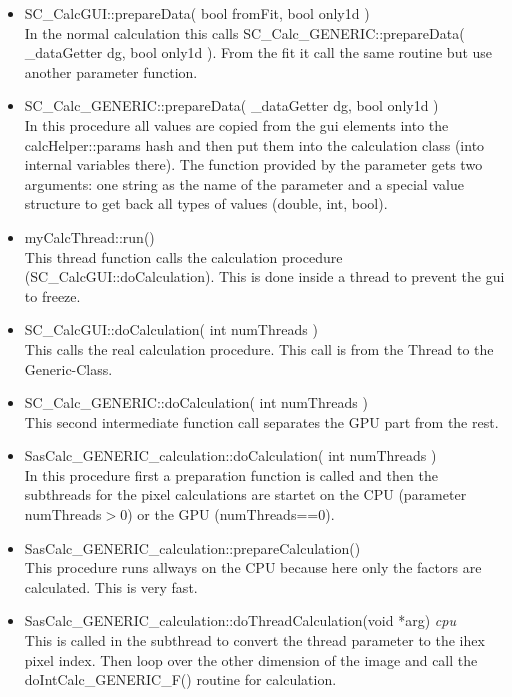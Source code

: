 \documentclass[11pt]{article} %
\begin{document}
\begin{itemize}
\item SC\_CalcGUI::prepareData( bool fromFit, bool only1d ) \\
	In the normal calculation this calls SC\_Calc\_GENERIC::prepareData( \_dataGetter dg, bool only1d ). From the fit it call the same routine but use another parameter function.

\item SC\_Calc\_GENERIC::prepareData( \_dataGetter dg, bool only1d ) \\
	In this procedure all values are copied from the gui elements into the calcHelper::params hash and then put them into the calculation class (into internal variables there). The function provided by the parameter gets two arguments: one string as the name of the parameter and a special value structure to get back all types of values (double, int, bool).

\item myCalcThread::run() \\
	This thread function calls the calculation procedure (SC\_CalcGUI::doCalculation). This is done inside a thread to prevent the gui to freeze.

\item SC\_CalcGUI::doCalculation( int numThreads ) \\
	This calls the real calculation procedure. This call is from the Thread to the Generic-Class.

\item SC\_Calc\_GENERIC::doCalculation( int numThreads ) \\
	This second intermediate function call separates the GPU part from the rest.

\item SasCalc\_GENERIC\_calculation::doCalculation( int numThreads ) \\
	In this procedure first a preparation function is called and then the subthreads for the pixel calculations are startet on the CPU (parameter numThreads$>$0) or the GPU (numThreads==0).

\item SasCalc\_GENERIC\_calculation::prepareCalculation() \\
	This procedure runs allways on the CPU because here only the factors are calculated. This is very fast.

\item SasCalc\_GENERIC\_calculation::doThreadCalculation(void *arg) {\it cpu} \\
	This is called in the subthread to convert the thread parameter to the ihex pixel index. Then loop over the other dimension of the image and call the doIntCalc\_GENERIC\_F() routine for calculation.


\end{itemize}
\end{document}
